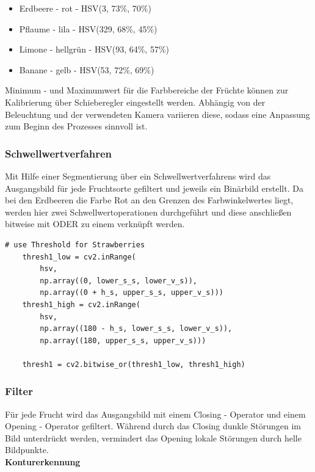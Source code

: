 \begin{itemize}
    \item Erdbeere - rot - HSV(3, 73\%, 70\%)
    \item Pflaume - lila - HSV(329, 68\%, 45\%)
    \item Limone - hellgrün - HSV(93, 64\%, 57\%)
    \item Banane - gelb - HSV(53, 72\%, 69\%)
\end{itemize}

Minimum - und Maximumwert für die Farbbereiche der Früchte können zur Kalibrierung über Schieberegler eingestellt werden. Abhängig von der Beleuchtung und der verwendeten Kamera variieren diese, sodass eine Anpassung zum Beginn des Prozesses sinnvoll ist. 

\subsubsection{Schwellwertverfahren}

Mit Hilfe einer Segmentierung über ein Schwellwertverfahrens wird das Ausgangsbild für jede Fruchtsorte gefiltert und jeweils ein Binärbild erstellt.
Da bei den Erdbeeren die Farbe Rot an den Grenzen des Farbwinkelwertes liegt, werden hier zwei Schwellwertoperationen durchgeführt und diese anschließen bitweise mit ODER zu einem verknüpft werden.
\lstset{language=Python}
\begin{lstlisting}[]
    # use Threshold for Strawberries
    thresh1_low = cv2.inRange(
        hsv,
        np.array((0, lower_s_s, lower_v_s)),
        np.array((0 + h_s, upper_s_s, upper_v_s)))
    thresh1_high = cv2.inRange(
        hsv,
        np.array((180 - h_s, lower_s_s, lower_v_s)),
        np.array((180, upper_s_s, upper_v_s)))

    thresh1 = cv2.bitwise_or(thresh1_low, thresh1_high)
\end{lstlisting}

\subsubsection{Filter}

Für jede Frucht wird das Ausgangsbild mit einem Closing - Operator und einem Opening - Operator gefiltert. Während durch das Closing dunkle Störungen im Bild unterdrückt werden, vermindert das Opening lokale Störungen durch helle Bildpunkte.  \\

\textbf{Konturerkennung}

